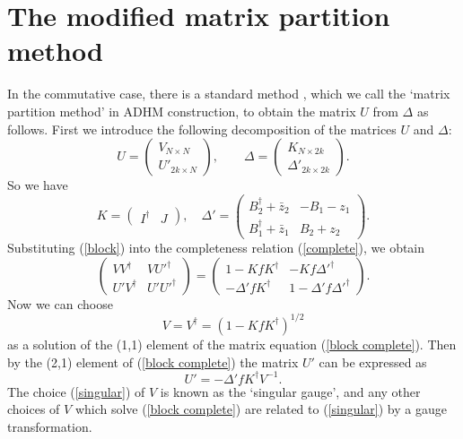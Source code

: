 \documentclass[a4paper,a4paper]{article}
\begin{document}
\section{The modified matrix partition method}

In the commutative case, there is a standard method \cite{decomp},
which we call the `matrix partition method' in ADHM construction,
to obtain the matrix $U$ from $\Delta$ as follows. First we
introduce the following decomposition of the matrices $U$ and
$\Delta$:
\begin{equation}\label{block}
U=\left(\begin{array}{c} V_{N\times N} \\
U'_{2k\times N}
\end{array}\right),\qquad
\Delta=\left(\begin{array}{c} K_{N\times 2k} \\ \Delta'_{2k\times
2k} \end{array}\right).
\end{equation}
So we have
\begin{equation}\label{Deltap}
K=\left(\begin{array}{cc} I^\dag & J
\end{array}\right),\quad \Delta'=\left(\begin{array}{cc}
B_2^\dag+\bar{z}_2 & -B_1-z_1
\\ B_1^\dag+\bar{z}_1 & B_2+z_2 \end{array}\right).
\end{equation}
Substituting (\ref{block}) into the completeness relation
(\ref{complete}), we obtain
\begin{equation}
\label{block complete}
\left(\begin{array}{cc} V V^\dag & V U'^\dag \\
U'V^\dag & U'U'^\dag \end{array}\right)=\left(\begin{array}{cc}
1-K f K^\dag & -K f \Delta'^\dag \\ -\Delta'f K^\dag &
1-\Delta'f\Delta'^\dag
\end{array}\right).
\end{equation}
Now we can choose
\begin{equation}
\label{singular} V=V^\dag=(1-K f K^\dag)^{1/2}
\end{equation}
as a solution of the (1,1) element of the matrix equation
(\ref{block complete}). Then by the (2,1) element of (\ref{block
complete}) the matrix $U'$ can be expressed as
\begin{equation}
\label{Up} U'=-\Delta'f K^\dag V^{-1}.
\end{equation}
The choice (\ref{singular}) of $V$ is known as the `singular
gauge', and any other choices of $V$ which solve (\ref{block
complete}) are related to (\ref{singular}) by a gauge
transformation.
\end{document}
